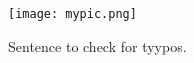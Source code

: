 \begin{figure}
\texttt{[image: mypic.png]}
\caption{Sentence to check for tyypos.}
\label{fig:test}
\end{figure}